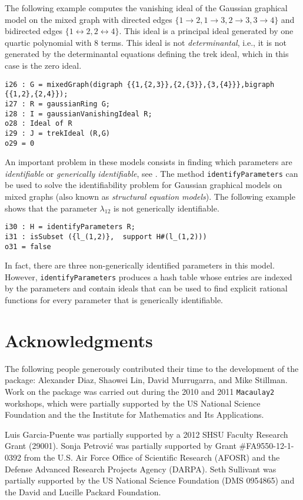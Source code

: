 \documentclass[letterpaper]{article}
\theoremstyle{definition}
\begin{document}
The following example computes the vanishing ideal of the Gaussian graphical
model  on the mixed graph with directed edges
$\{1\to 2, 1\to 3, 2\to 3, 3\to 4\}$ and bidirected edges $\{1 \leftrightarrow 2, 2 \leftrightarrow
4\}$. This ideal is a principal ideal generated by one quartic polynomial with 8
terms. This ideal is not \emph{determinantal}, i.e., it is not generated by the
determinantal equations defining 
the trek ideal, which in this case is the zero ideal.


\begin{verbatim}
i26 : G = mixedGraph(digraph {{1,{2,3}},{2,{3}},{3,{4}}},bigraph {{1,2},{2,4}});
i27 : R = gaussianRing G;
i28 : I = gaussianVanishingIdeal R;
o28 : Ideal of R
i29 : J = trekIdeal (R,G)
o29 = 0
\end{verbatim}

An important problem in these models consists in finding which parameters are
\emph{identifiable} or \emph{generically identifiable}, see \cite{GPSS}. The method
\texttt{identifyParameters} can be used to solve the identifiability problem for
Gaussian graphical  models on mixed graphs (also known as \emph{structural
  equation models}). The following example shows that the parameter
$\lambda_{12}$ is not generically identifiable. 

\begin{verbatim}
i30 : H = identifyParameters R;
i31 : isSubset ({l_(1,2)},  support H#(l_(1,2)))
o31 = false
\end{verbatim}

In fact, there are three non-generically identified parameters in this
model. However, \texttt{identifyParameters} produces a hash table whose entries
are indexed by the parameters and contain ideals that can be used to find
explicit rational functions for every parameter that is generically
identifiable.

\section*{Acknowledgments }
The following people generously contributed their time to the
development of the package:  Alexander Diaz, Shaowei Lin, David Murrugarra, and Mike 
Stillman.  Work on the package was carried out during the 2010 and 2011
{\tt Macaulay2} workshops, which were partially supported by the US National 
Science Foundation and the the Institute for Mathematics and Its
Applications.

Luis Garcia-Puente was partially supported by a 2012 SHSU Faculty Research Grant (29001).
Sonja Petrovi\'c was partially supported by Grant \#FA9550-12-1-0392 from the U.S. Air Force Office of Scientific Research (AFOSR) and the Defense Advanced Research Projects Agency (DARPA).
Seth Sullivant was partially supported by the US National Science Foundation (DMS 0954865) and the David and Lucille Packard Foundation.
\end{document}
